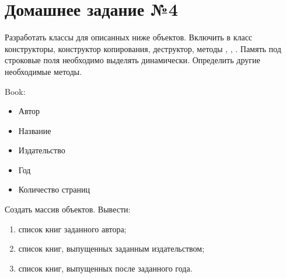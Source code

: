 \section*{Домашнее задание №4}

Разработать классы для описанных ниже объектов. Включить в класс
конструкторы, конструктор копирования, деструктор, методы ,
, . Память под строковые поля необходимо выделять
динамически. Определить другие необходимые методы.

Book:
\begin{itemize}
	\item Автор
	\item Название
	\item Издательство
	\item Год
	\item Количество страниц
\end{itemize}

Создать массив объектов. Вывести:
\begin{enumerate}
	\item список книг заданного автора;
	\item список книг, выпущенных заданным издательством;
	\item список книг, выпущенных после заданного года.
\end{enumerate}

